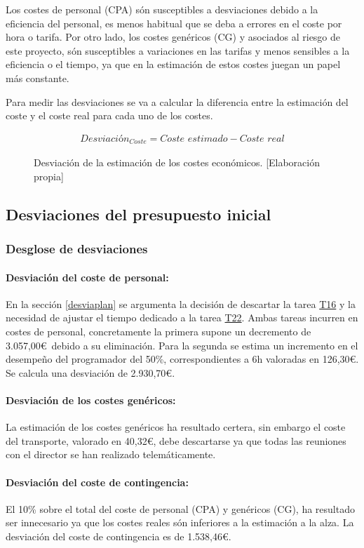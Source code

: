 Los costes de personal (CPA) són susceptibles a desviaciones debido a la eficiencia del personal, es menos
habitual que se deba a errores en el coste por hora o tarifa. Por otro lado, los costes genéricos (CG) y asociados
al riesgo de este proyecto, són susceptibles a variaciones en las tarifas y menos sensibles a la eficiencia o el
tiempo, ya que en la estimación de estos costes juegan un papel más constante.

Para medir las desviaciones se va a calcular la diferencia entre la estimación
del coste y el coste real para cada uno de los costes.
\begin{figure}[H]
    \begin{align*}
        \textit{Desviación}_{\textit{Coste}} = \textit{Coste estimado} - \textit{Coste real}
    \end{align*}
    \caption{Desviación de la estimación de los costes económicos.  [Elaboración propia]}
\end{figure}


\subsection{Desviaciones del presupuesto inicial}
\subsubsection{Desglose de desviaciones}
\paragraph{Desviación del coste de personal:}
En la sección \ref{desviaplan} se argumenta la decisión de descartar la tarea \hyperref[T16]{T16} y la necesidad de ajustar el tiempo dedicado a la tarea \hyperref[T22]{T22}.
Ambas tareas incurren en costes de personal, concretamente la primera supone un decremento de 3.057,00\euro\ debido a su eliminación. Para la segunda se estima un incremento en el desempeño del programador del 50\%, correspondientes a 6h valoradas en 126,30\euro.
Se calcula una desviación de 2.930,70\euro.
\paragraph{Desviación de los costes genéricos:}
La estimación de los costes genéricos ha resultado certera, sin embargo el coste del transporte, valorado en 40,32\euro, debe descartarse ya que todas las reuniones con el director se han realizado telemáticamente.
\paragraph{Desviación del coste de contingencia:}
El 10\% sobre el total del coste de personal (CPA) y genéricos (CG), ha resultado ser innecesario ya que los costes reales són inferiores a la estimación a la alza. La desviación del coste de contingencia es de 1.538,46\euro.
